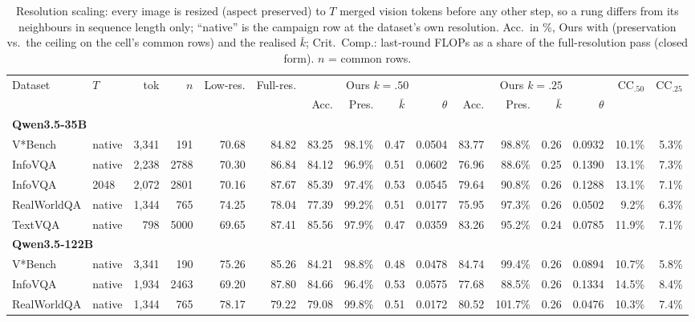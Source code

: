 \begin{table}[t]
\centering
\small
\caption{Resolution scaling: every image is resized (aspect preserved) to $T$ merged vision tokens before any other step, so a rung differs from its neighbours in sequence length only; ``native'' is the campaign row at the dataset's own resolution. Acc.\ in \%, Ours with (preservation vs.\ the ceiling on the cell's common rows) and the realised $\bar k$; Crit.\ Comp.: last-round FLOPs as a share of the full-resolution pass (closed form). $n$ = common rows.}
\label{tab:scaling}
\begin{tabular}{llrrrrrrrrrrrrrr}
\toprule
\multirow{2}{*}{Dataset} & \multirow{2}{*}{$T$} & \multirow{2}{*}{tok} & \multirow{2}{*}{$n$} & \multirow{2}{*}{Low-res.} & \multirow{2}{*}{Full-res.} & \multicolumn{4}{c}{Ours $k{=}.50$} & \multicolumn{4}{c}{Ours $k{=}.25$} & \multirow{2}{*}{CC$_{.50}$} & \multirow{2}{*}{CC$_{.25}$} \\
\cmidrule(lr){7-10} \cmidrule(lr){11-14}
 & & & & & & Acc. & Pres. & $\bar k$ & $\theta$ & Acc. & Pres. & $\bar k$ & $\theta$ & & \\
\midrule
\multicolumn{10}{l}{\textbf{Qwen3.5-35B}} \\
V*Bench & native & 3,341 & 191 & 70.68 & 84.82 & 83.25 & 98.1\% & 0.47 & 0.0504 & 83.77 & 98.8\% & 0.26 & 0.0932 & 10.1\% & 5.3\% \\
InfoVQA & native & 2,238 & 2788 & 70.30 & 86.84 & 84.12 & 96.9\% & 0.51 & 0.0602 & 76.96 & 88.6\% & 0.25 & 0.1390 & 13.1\% & 7.3\% \\
InfoVQA & 2048 & 2,072 & 2801 & 70.16 & 87.67 & 85.39 & 97.4\% & 0.53 & 0.0545 & 79.64 & 90.8\% & 0.26 & 0.1288 & 13.1\% & 7.1\% \\
RealWorldQA & native & 1,344 & 765 & 74.25 & 78.04 & 77.39 & 99.2\% & 0.51 & 0.0177 & 75.95 & 97.3\% & 0.26 & 0.0502 & 9.2\% & 6.3\% \\
TextVQA & native & 798 & 5000 & 69.65 & 87.41 & 85.56 & 97.9\% & 0.47 & 0.0359 & 83.26 & 95.2\% & 0.24 & 0.0785 & 11.9\% & 7.1\% \\
\midrule
\multicolumn{10}{l}{\textbf{Qwen3.5-122B}} \\
V*Bench & native & 3,341 & 190 & 75.26 & 85.26 & 84.21 & 98.8\% & 0.48 & 0.0478 & 84.74 & 99.4\% & 0.26 & 0.0894 & 10.7\% & 5.8\% \\
InfoVQA & native & 1,934 & 2463 & 69.20 & 87.80 & 84.66 & 96.4\% & 0.53 & 0.0575 & 77.68 & 88.5\% & 0.26 & 0.1334 & 14.5\% & 8.4\% \\
RealWorldQA & native & 1,344 & 765 & 78.17 & 79.22 & 79.08 & 99.8\% & 0.51 & 0.0172 & 80.52 & 101.7\% & 0.26 & 0.0476 & 10.3\% & 7.4\% \\

\end{tabular}
\end{table}

